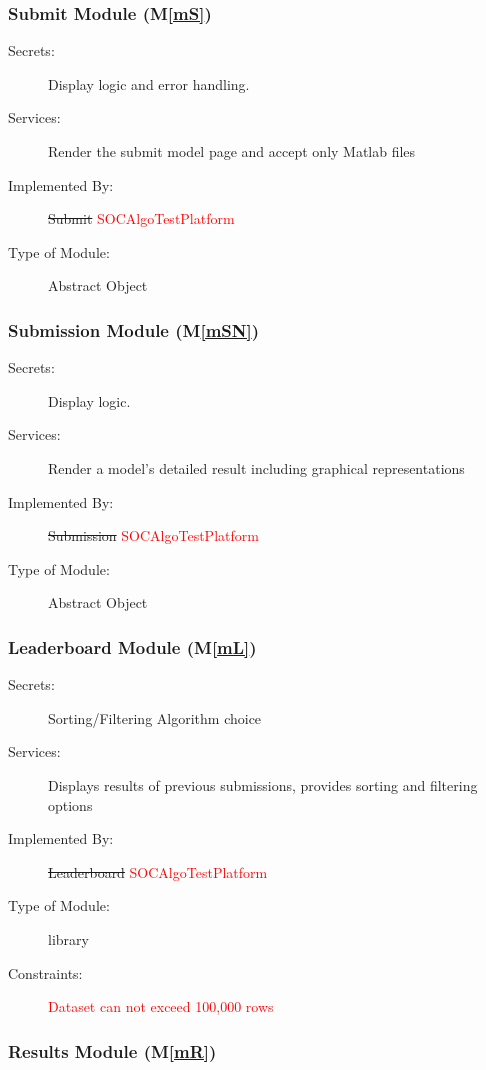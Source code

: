 \documentclass[12pt, titlepage]{article}
\newcommand{\mref}[1]{M\ref{#1}}
\begin{document}
\subsubsection{Submit Module (\mref{mS})}

\begin{description}
\item[Secrets:] Display logic and error handling.
\item[Services:] Render the submit model page and accept only Matlab files
\item[Implemented By:] \sout{Submit}  \textcolor{red}{SOCAlgoTestPlatform}
\item[Type of Module:] Abstract Object
\end{description}

\subsubsection{Submission Module (\mref{mSN})}

\begin{description}
\item[Secrets:] Display logic.
\item[Services:] Render a model's detailed result including graphical representations
\item[Implemented By:] \sout{Submission}  \textcolor{red}{SOCAlgoTestPlatform}
\item[Type of Module:] Abstract Object
\end{description}

\subsubsection{Leaderboard Module (\mref{mL})}

\begin{description}
\item[Secrets:] Sorting/Filtering Algorithm choice
\item[Services:] Displays results of previous submissions, provides sorting and filtering options
\item[Implemented By:] \sout{Leaderboard} \textcolor{red}{SOCAlgoTestPlatform}
\item[Type of Module:] library
\item[Constraints:]  \textcolor{red}{Dataset can not exceed 100,000 rows}
\end{description}

\subsubsection{Results Module (\mref{mR})}
\end{document}
